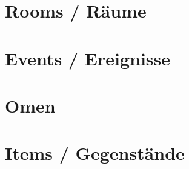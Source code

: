 \documentclass[10pt,a4paper,oneside,ngerman]{article}
\begin{document}
\tableofcontents


\pagebreak

\section{Rooms / Räume}



\twocolumn

\section{Events / Ereignisse}


\pagebreak

\section{Omen}


\pagebreak

\section{Items / Gegenstände}



\onecolumn
\end{document}
